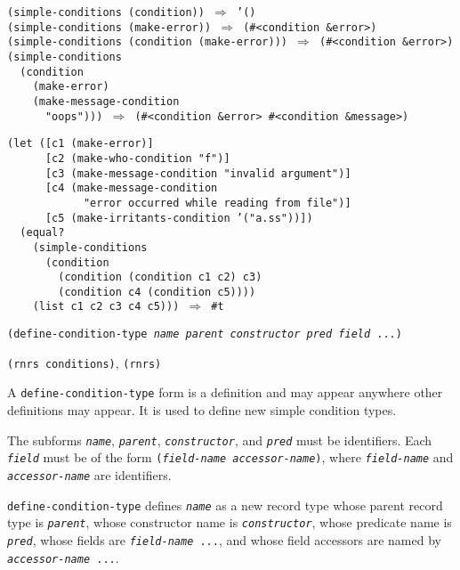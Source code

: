 \begin{alltt}
(simple-conditions (condition)) \(\Rightarrow\) '()
(simple-conditions (make-error)) \(\Rightarrow\) (\#{}\textless{}condition \&{}error\textgreater{})
(simple-conditions (condition (make-error))) \(\Rightarrow\) (\#{}\textless{}condition \&{}error\textgreater{})
(simple-conditions
  (condition
    (make-error)
    (make-message-condition
      "oops"))) \(\Rightarrow\) (\#{}\textless{}condition \&{}error\textgreater{} \#{}\textless{}condition \&{}message\textgreater{})

(let ([c1 (make-error)]
      [c2 (make-who-condition "f")]
      [c3 (make-message-condition "invalid argument")]
      [c4 (make-message-condition
            "error occurred while reading from file")]
      [c5 (make-irritants-condition '("a.ss"))])
  (equal?
    (simple-conditions
      (condition
        (condition (condition c1 c2) c3)
        (condition c4 (condition c5))))
    (list c1 c2 c3 c4 c5))) \(\Rightarrow\) \#{}t
\end{alltt}

\begin{description}

\label{exceptions_s17}\item[syntax] \texttt{(define-condition-type \textit{name} \textit{parent} \textit{constructor} \textit{pred} \textit{field} ...)}



\item[libraries] \texttt{(rnrs conditions)}, \texttt{(rnrs)}
\end{description}


A \texttt{define-condition-type} form is a definition and may appear anywhere other
definitions may appear.
It is used to define new simple condition types.


The subforms \texttt{\textit{name}}, \texttt{\textit{parent}}, \texttt{\textit{constructor}}, and \texttt{\textit{pred}}
must be identifiers.
Each \texttt{\textit{field}} must be of the form
\texttt{(\textit{field-name} \textit{accessor-name})},
where \texttt{\textit{field-name}} and \texttt{\textit{accessor-name}} are identifiers.

\texttt{define-condition-type} defines \texttt{\textit{name}} as a new record type whose
parent record type is \texttt{\textit{parent}}, whose constructor name is
\texttt{\textit{constructor}}, whose predicate name is \texttt{\textit{pred}}, whose fields
are \texttt{\textit{field-name} ...}, and whose field accessors are named
by \texttt{\textit{accessor-name} ...}.

